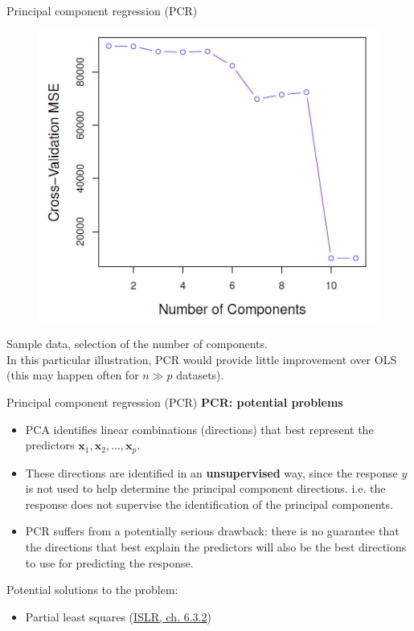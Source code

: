 \documentclass{beamer}
\begin{document}
\begin{frame}{Principal component regression (PCR)}
\vspace{-0.7cm}
\begin{figure}
\includegraphics[scale=0.30]{IMG/PCRcomponent.jpg}
\end{figure}
\vspace{-0.5cm}
\centering Sample data, selection of the number of components. \\In this particular illustration, PCR would provide little improvement over OLS (this may happen often for $n\gg p$ datasets). 
\end{frame}
\begin{frame}{Principal component regression (PCR)}
\textbf{PCR: potential problems}
\medskip
\begin{itemize}
\item PCA identifies linear combinations (directions) that best
represent the predictors $\bm{x}_1, \bm{x}_2, \dots , \bm{x}_p$.
\item These directions are identified in an \textbf{unsupervised} way, since the response $y$ is not used to help determine the principal component directions. i.e. the response does not supervise the identification of the principal components.
\item PCR suffers from a potentially serious drawback: there is no guarantee that the directions that best explain the predictors will also be the best directions to use for predicting the response.
\end{itemize}
\medskip
Potential solutions to the problem:
\begin{itemize}
\item Partial least squares (\textcolor{blue}{\underline{\href{http://www-bcf.usc.edu/~gareth/ISL/}{ISLR, ch. 6.3.2}}})
\end{itemize}
\end{frame}
\end{document}
